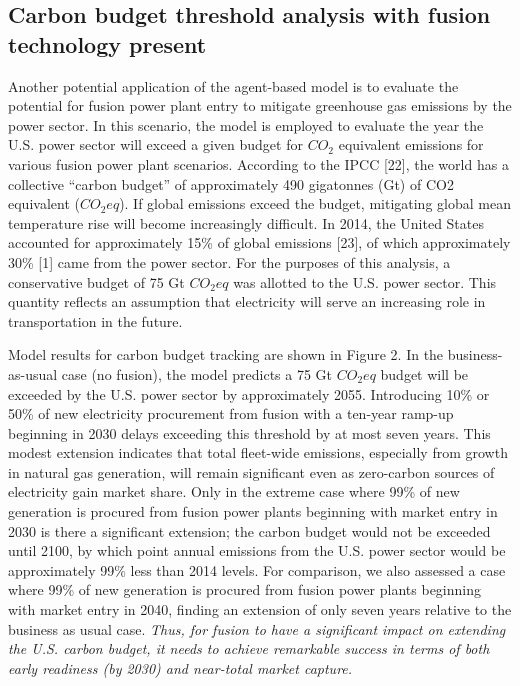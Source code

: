 \documentclass[preprint, 12pt]{elsarticle}
\begin{document}
\subsection{Carbon budget threshold analysis with fusion technology present}

Another potential application of the agent-based model is to evaluate the potential for fusion power plant entry to mitigate greenhouse gas emissions by the power sector. In this scenario, the model is employed to evaluate the year the U.S. power sector will exceed a given budget for $CO_2$ equivalent emissions for various fusion power plant scenarios. According to the IPCC [22], the world has a collective “carbon budget” of approximately 490 gigatonnes (Gt) of CO2 equivalent ($CO_2eq$). If global emissions exceed the budget, mitigating global mean temperature rise will become increasingly difficult. In 2014, the United States accounted for approximately 15\% of global emissions [23], of which approximately 30\% [1] came from the power sector. For the purposes of this analysis, a conservative budget of 75 Gt $CO_2eq$ was allotted to the U.S. power sector. This quantity reflects an assumption that electricity will serve an increasing role in transportation in the future.

Model results for carbon budget tracking are shown in Figure 2. In the business-as-usual case (no fusion), the model predicts a 75 Gt $CO_2eq$ budget will be exceeded by the U.S. power sector by approximately 2055. Introducing 10\% or 50\% of new electricity procurement from fusion with a ten-year ramp-up beginning in 2030 delays exceeding this threshold by at most seven years. This modest extension indicates that total fleet-wide emissions, especially from growth in natural gas generation, will remain significant even as zero-carbon sources of electricity gain market share. Only in the extreme case where 99\% of new generation is procured from fusion power plants beginning with market entry in 2030 is there a significant extension; the carbon budget would not be exceeded until 2100, by which point annual emissions from the U.S. power sector would be approximately 99\% less than 2014 levels. For comparison, we also assessed a case where 99\% of new generation is procured from fusion power plants beginning with market entry in 2040, finding an extension of only seven years relative to the business as usual case. \emph{Thus, for fusion to have a significant impact on extending the U.S. carbon budget, it needs to achieve remarkable success in terms of both early readiness (by 2030) and near-total market capture.}
\end{document}
